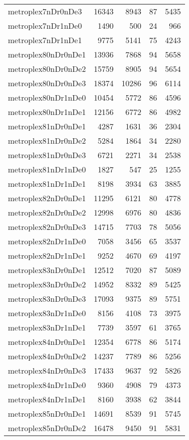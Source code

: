 \begin{longtable}{lrrrr}
metroplex7nDr0nDe3 & 16343 & 8943 & 87 & 5435 \\
metroplex7nDr1nDe0 & 1490 & 500 & 24 & 966 \\
metroplex7nDr1nDe1 & 9775 & 5141 & 75 & 4243 \\
metroplex80nDr0nDe1 & 13936 & 7868 & 94 & 5658 \\
metroplex80nDr0nDe2 & 15759 & 8905 & 94 & 5654 \\
metroplex80nDr0nDe3 & 18374 & 10286 & 96 & 6114 \\
metroplex80nDr1nDe0 & 10454 & 5772 & 86 & 4596 \\
metroplex80nDr1nDe1 & 12156 & 6772 & 86 & 4982 \\
metroplex81nDr0nDe1 & 4287 & 1631 & 36 & 2304 \\
metroplex81nDr0nDe2 & 5284 & 1864 & 34 & 2280 \\
metroplex81nDr0nDe3 & 6721 & 2271 & 34 & 2538 \\
metroplex81nDr1nDe0 & 1827 & 547 & 25 & 1255 \\
metroplex81nDr1nDe1 & 8198 & 3934 & 63 & 3885 \\
metroplex82nDr0nDe1 & 11295 & 6121 & 80 & 4778 \\
metroplex82nDr0nDe2 & 12998 & 6976 & 80 & 4836 \\
metroplex82nDr0nDe3 & 14715 & 7703 & 78 & 5056 \\
metroplex82nDr1nDe0 & 7058 & 3456 & 65 & 3537 \\
metroplex82nDr1nDe1 & 9252 & 4670 & 69 & 4197 \\
metroplex83nDr0nDe1 & 12512 & 7020 & 87 & 5089 \\
metroplex83nDr0nDe2 & 14952 & 8332 & 89 & 5425 \\
metroplex83nDr0nDe3 & 17093 & 9375 & 89 & 5751 \\
metroplex83nDr1nDe0 & 8156 & 4108 & 73 & 3975 \\
metroplex83nDr1nDe1 & 7739 & 3597 & 61 & 3765 \\
metroplex84nDr0nDe1 & 12354 & 6778 & 86 & 5174 \\
metroplex84nDr0nDe2 & 14237 & 7789 & 86 & 5256 \\
metroplex84nDr0nDe3 & 17433 & 9637 & 92 & 5826 \\
metroplex84nDr1nDe0 & 9360 & 4908 & 79 & 4373 \\
metroplex84nDr1nDe1 & 8160 & 3938 & 62 & 3844 \\
metroplex85nDr0nDe1 & 14691 & 8539 & 91 & 5745 \\
metroplex85nDr0nDe2 & 16478 & 9450 & 91 & 5831 \\

\end{longtable}
